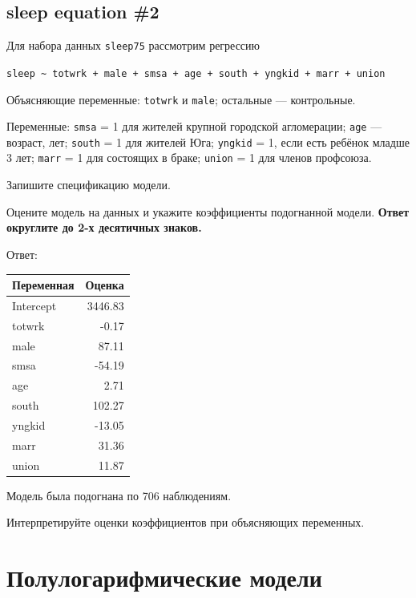 \documentclass[
  russian,
]{article}
\newcounter{none} %
\begin{document}
\subsection{sleep equation \#2}\label{sleep-equation-2}

Для набора данных \texttt{sleep75} рассмотрим регрессию

\texttt{sleep\ \textasciitilde{}\ totwrk\ +\ male\ +\ smsa\ +\ age\ +\ south\ +\ yngkid\ +\ marr\ +\ union}

Объясняющие переменные: \texttt{totwrk} и \texttt{male}; остальные ---
контрольные.

Переменные: \texttt{smsa} = 1 для жителей крупной городской агломерации;
\texttt{age} --- возраст, лет; \texttt{south} = 1 для жителей Юга;
\texttt{yngkid} = 1, если есть ребёнок младше 3 лет; \texttt{marr} = 1
для состоящих в браке; \texttt{union} = 1 для членов профсоюза.

Запишите спецификацию модели.

Оцените модель на данных и укажите коэффициенты подогнанной модели.
\textbf{Ответ округлите до 2-х десятичных знаков.}

Ответ:

{\def\LTcaptype{none} %
\begin{longtable}[]{@{}lr@{}}
\toprule\noalign{}
Переменная & Оценка \\
\midrule\noalign{}
\endhead
\bottomrule\noalign{}
\endlastfoot
Intercept & 3446.83 \\
totwrk & -0.17 \\
male & 87.11 \\
smsa & -54.19 \\
age & 2.71 \\
south & 102.27 \\
yngkid & -13.05 \\
marr & 31.36 \\
union & 11.87 \\
\end{longtable}
}

Модель была подогнана по 706 наблюдениям.

Интерпретируйте оценки коэффициентов при объясняющих переменных.

\section{Полулогарифмические
модели}\label{ux43fux43eux43bux443ux43bux43eux433ux430ux440ux438ux444ux43cux438ux447ux435ux441ux43aux438ux435-ux43cux43eux434ux435ux43bux438}
\end{document}
